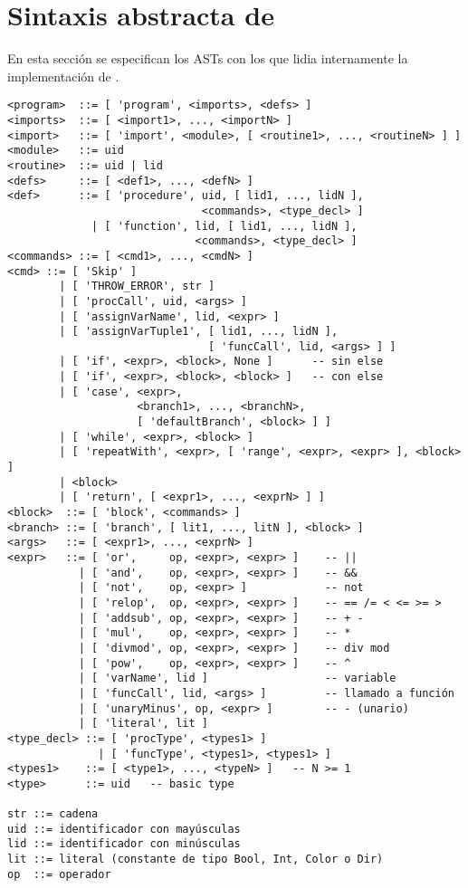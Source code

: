 \documentclass{article}
\begin{document}
\newpage
\section{Sintaxis abstracta de \Gbs}

En esta secci\'on se especifican los ASTs con los que lidia internamente
la implementaci\'on de \PGbs.

\begin{verbatim}
<program>  ::= [ 'program', <imports>, <defs> ]
<imports>  ::= [ <import1>, ..., <importN> ]
<import>   ::= [ 'import', <module>, [ <routine1>, ..., <routineN> ] ]
<module>   ::= uid
<routine>  ::= uid | lid
<defs>     ::= [ <def1>, ..., <defN> ]
<def>      ::= [ 'procedure', uid, [ lid1, ..., lidN ],
                              <commands>, <type_decl> ]
             | [ 'function', lid, [ lid1, ..., lidN ],
                             <commands>, <type_decl> ]
<commands> ::= [ <cmd1>, ..., <cmdN> ]
<cmd> ::= [ 'Skip' ]
        | [ 'THROW_ERROR', str ]
        | [ 'procCall', uid, <args> ]
        | [ 'assignVarName', lid, <expr> ]
        | [ 'assignVarTuple1', [ lid1, ..., lidN ],
                               [ 'funcCall', lid, <args> ] ]
        | [ 'if', <expr>, <block>, None ]      -- sin else
        | [ 'if', <expr>, <block>, <block> ]   -- con else
        | [ 'case', <expr>,
                    <branch1>, ..., <branchN>,
                    [ 'defaultBranch', <block> ] ]
        | [ 'while', <expr>, <block> ]
        | [ 'repeatWith', <expr>, [ 'range', <expr>, <expr> ], <block> ]
        | <block>
        | [ 'return', [ <expr1>, ..., <exprN> ] ]
<block>  ::= [ 'block', <commands> ]
<branch> ::= [ 'branch', [ lit1, ..., litN ], <block> ]
<args>   ::= [ <expr1>, ..., <exprN> ]
<expr>   ::= [ 'or',     op, <expr>, <expr> ]    -- ||
           | [ 'and',    op, <expr>, <expr> ]    -- &&
           | [ 'not',    op, <expr> ]            -- not
           | [ 'relop',  op, <expr>, <expr> ]    -- == /= < <= >= >
           | [ 'addsub', op, <expr>, <expr> ]    -- + -
           | [ 'mul',    op, <expr>, <expr> ]    -- *
           | [ 'divmod', op, <expr>, <expr> ]    -- div mod
           | [ 'pow',    op, <expr>, <expr> ]    -- ^
           | [ 'varName', lid ]                  -- variable
           | [ 'funcCall', lid, <args> ]         -- llamado a función
           | [ 'unaryMinus', op, <expr> ]        -- - (unario)
           | [ 'literal', lit ]
<type_decl> ::= [ 'procType', <types1> ]
              | [ 'funcType', <types1>, <types1> ]
<types1>    ::= [ <type1>, ..., <typeN> ]   -- N >= 1
<type>      ::= uid   -- basic type

str ::= cadena
uid ::= identificador con mayúsculas
lid ::= identificador con minúsculas
lit ::= literal (constante de tipo Bool, Int, Color o Dir)
op  ::= operador
\end{verbatim}
\end{document}

